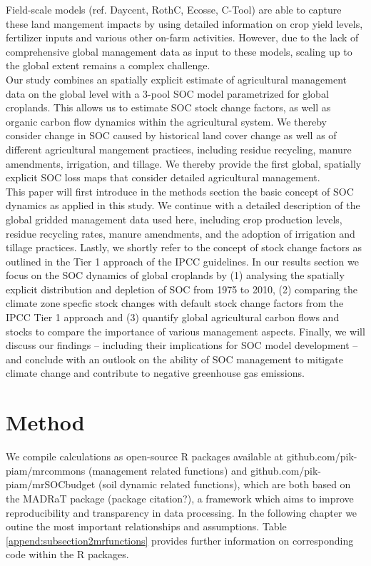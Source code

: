 \documentclass[gc, manuscript]{copernicus}
\begin{document}
Field-scale models (ref. Daycent, RothC, Ecosse, C-Tool) are able to capture these land mangement impacts by using detailed information on crop yield levels, fertilizer inputs and various other on-farm activities. However, due to the lack of comprehensive global management data as input to these models, scaling up to the global extent remains a complex challenge.\\
Our study combines an spatially explicit estimate of agricultural management data on the global level with a 3-pool SOC model parametrized for global croplands. This allows us to estimate SOC stock change factors, as well as organic carbon flow dynamics within the agricultural system. We thereby consider change in SOC caused by historical land cover change as well as of different agricultural mangement practices, including residue recycling, manure amendments, irrigation, and tillage. We thereby provide the first global, spatially explicit SOC loss maps that consider detailed agricultural management.\\
This paper will first introduce in the methods section the basic concept of SOC dynamics as applied in this study. We continue with a detailed description of the global gridded management data used here, including crop production levels, residue recycling rates, manure amendments, and the adoption of irrigation and tillage practices. Lastly, we shortly refer to the concept of stock change factors as outlined in the Tier 1 approach of the IPCC guidelines. In our results section we focus on the SOC dynamics of global croplands by (1) analysing the spatially explicit distribution and depletion of SOC from 1975 to 2010, (2) comparing the climate zone specfic stock changes with default stock change factors from the IPCC Tier 1 approach and (3) quantify global agricultural carbon flows and stocks to compare the importance of various management aspects. Finally, we will discuss our findings -- including their implications for SOC model development -- and conclude with an outlook on the ability of SOC management to mitigate climate change and contribute to negative greenhouse gas emissions.\\
\newpage

\hypertarget{method}{%
\section{Method}\label{method}}

We compile calculations as open-source R packages available at github.com/pik-piam/mrcommons (management related functions) and github.com/pik-piam/mrSOCbudget (soil dynamic related functions), which are both based on the MADRaT package (package citation?), a framework which aims to improve reproducibility and transparency in data processing.
In the following chapter we outine the most important relationships and assumptions. Table \ref{append:subsection2mrfunctions} provides further information on corresponding code within the R packages.
\end{document}
